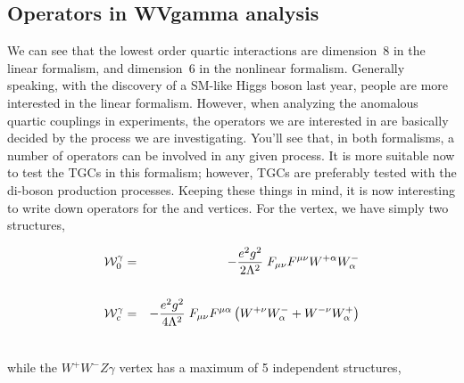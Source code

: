 \subsection{Operators in WVgamma analysis}

We can see that the lowest order quartic interactions are dimension~8
in the linear formalism, and dimension~6 in the nonlinear
formalism. Generally speaking, with the discovery of a SM-like Higgs
boson last year, people are more interested in the linear
formalism. However, when analyzing the anomalous quartic couplings in
experiments, the operators we are interested in are basically decided
by the process we are investigating. You'll see that, in both
formalisms, a number of operators can be involved in any given
process. It is more suitable now to test the TGCs in this formalism;
however, TGCs are preferably tested with the di-boson production
processes. Keeping these things in mind, it is now interesting to
write down operators for the
\wwaa and \wwza vertices. For the \wwaa vertex, we have simply two structures,

\begin{eqnarray}
\label{em_oper1}
{\cal W}_{0}^{\gamma} &=& -\dfrac{e^{2}g^{2}}{2\Lambda^{2}}\; F_{\mu \nu} F^{\mu \nu} W^{+\alpha}W^{-}_{\alpha} \nonumber \\
&& \nonumber\\
{\cal W}_{c}^{\gamma} &=& -\dfrac{e^{2}g^{2}}{4\Lambda^{2}}\; F_{\mu \nu} F^{\mu \alpha} \left( W^{+\nu}W^{-}_{\alpha} + W^{-\nu}W^{+}_{\alpha} \right) \\
&& \nonumber
\end{eqnarray}

while the $W^{+}W^{-}Z\gamma$ vertex has a maximum of 5 independent structures,

